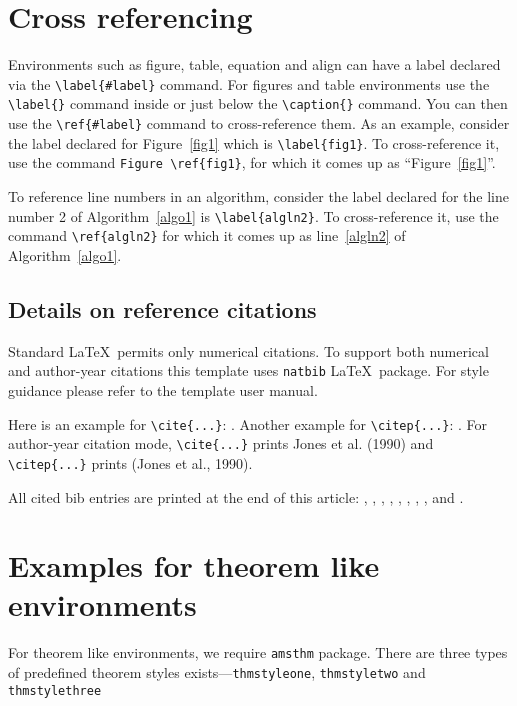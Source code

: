 \documentclass[sn-standardnature]{sn-jnl}%
\theoremstyle{thmstyleone}%
\theoremstyle{thmstyletwo}%
\theoremstyle{thmstylethree}%
\begin{document}
\section{Cross referencing}\label{sec8}

Environments such as figure, table, equation and align can have a label
declared via the \verb+\label{#label}+ command. For figures and table
environments use the \verb+\label{}+ command inside or just
below the \verb+\caption{}+ command. You can then use the
\verb+\ref{#label}+ command to cross-reference them. As an example, consider
the label declared for Figure~\ref{fig1} which is
\verb+\label{fig1}+. To cross-reference it, use the command
\verb+Figure \ref{fig1}+, for which it comes up as
``Figure~\ref{fig1}''.

To reference line numbers in an algorithm, consider the label declared for the line number 2 of Algorithm~\ref{algo1} is \verb+\label{algln2}+. To cross-reference it, use the command \verb+\ref{algln2}+ for which it comes up as line~\ref{algln2} of Algorithm~\ref{algo1}.

\subsection{Details on reference citations}\label{subsec7}

Standard \LaTeX\ permits only numerical citations. To support both numerical and author-year citations this template uses \verb+natbib+ \LaTeX\ package. For style guidance please refer to the template user manual.

Here is an example for \verb+\cite{...}+: \cite{bib1}. Another example for \verb+\citep{...}+: \citep{bib2}. For author-year citation mode, \verb+\cite{...}+ prints Jones et al. (1990) and \verb+\citep{...}+ prints (Jones et al., 1990).

All cited bib entries are printed at the end of this article: \cite{bib3}, \cite{bib4}, \cite{bib5}, \cite{bib6}, \cite{bib7}, \cite{bib8}, \cite{bib9}, \cite{bib10}, \cite{bib11} and \cite{bib12}.

\section{Examples for theorem like environments}\label{sec10}

For theorem like environments, we require \verb+amsthm+ package. There are three types of predefined theorem styles exists---\verb+thmstyleone+, \verb+thmstyletwo+ and \verb+thmstylethree+
\end{document}
